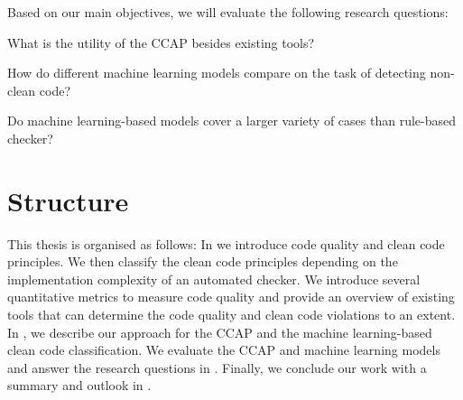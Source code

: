 Based on our main objectives, we will evaluate the following research questions:
\begin{description}
    \setlength{\itemsep}{1pt}
    \item[RQ1:] What is the utility of the CCAP besides existing tools? 
    \item[RQ2:] How do different machine learning models compare on the task of detecting non-clean code?
    \item[RQ3:] Do machine learning-based models cover a larger variety of cases than rule-based checker? 
\end{description}


\section{Structure}
This thesis is organised as follows: In  we introduce code quality and clean code principles. We then classify the clean code principles depending on the implementation complexity of an automated checker. We introduce several quantitative metrics to measure code quality and provide an overview of existing tools that can determine the code quality and clean code violations to an extent. 
In , we describe our approach for the CCAP and the machine learning-based clean code classification. We evaluate the CCAP and machine learning models and answer the research questions in . Finally, we conclude our work with a summary and outlook in .